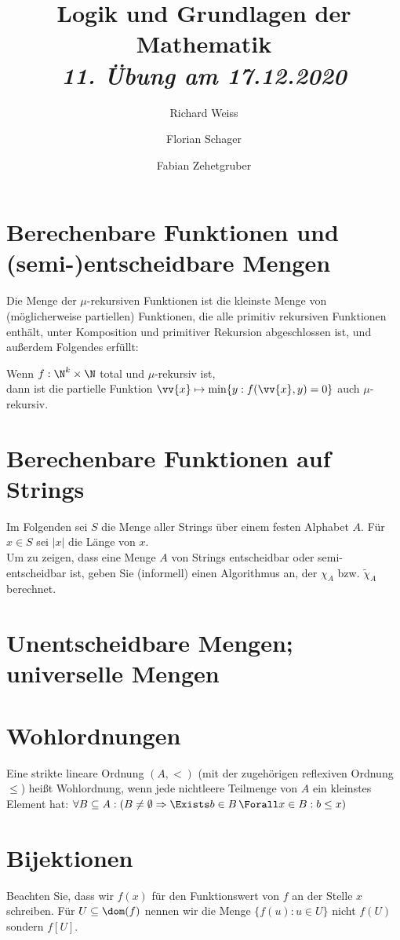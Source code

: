 \documentclass{article}
\title
{
  Logik und Grundlagen der Mathematik \\
  \vspace{4pt}
  \normalsize
  \textit{11. Übung am 17.12.2020}
}
\author
{
  Richard Weiss
  \and
  Florian Schager
  \and
  Fabian Zehetgruber
}
\date{}
\begin{document}
\maketitle

\section*{Berechenbare Funktionen und (semi-)entscheidbare Mengen}

Die Menge der $\mu$-rekursiven Funktionen ist die kleinste Menge von (möglicherweise partiellen)
Funktionen, die alle primitiv rekursiven Funktionen enthält, unter Komposition und
primitiver Rekursion abgeschlossen ist, und außerdem Folgendes erfüllt:

\begin{adjustwidth}{1cm}{}
Wenn $f: \N^k \times \N$ total und $\mu$-rekursiv ist, \\
dann ist die partielle Funktion $\vv{x} \mapsto \min\{y: f(\vv{x},y) = 0\}$ auch
$\mu$-rekursiv.
\end{adjustwidth}




\section*{Berechenbare Funktionen auf Strings}

Im Folgenden sei $S$ die Menge aller Strings über einem festen Alphabet $A$.
Für $x \in S$ sei $|x|$ die Länge von $x$. \\
Um zu zeigen, dass eine Menge $A$ von Strings entscheidbar oder semi-entscheidbar
ist, geben Sie (informell) einen Algorithmus an, der $\chi_A$ bzw. $\tilde{\chi}_A$
berechnet.



\section*{Unentscheidbare Mengen; universelle Mengen}



\section*{Wohlordnungen}

Eine strikte lineare Ordnung $(A, <)$ (mit der zugehörigen reflexiven Ordnung $\leq$)
heißt Wohlordnung, wenn jede nichtleere Teilmenge von $A$ ein kleinstes Element hat:
$\forall B \subseteq A: (B \neq \emptyset \Rightarrow \Exists b \in B\, \Forall x \in B: b \leq x)$





\section*{Bijektionen}

Beachten Sie, dass wir $f(x)$ für den Funktionswert von $f$ an der Stelle $x$ schreiben.
Für $U \subseteq \dom(f)$ nennen wir die Menge $\{f(u): u \in U\}$ nicht $f(U)$
sondern $f[U]$.


\end{document}
